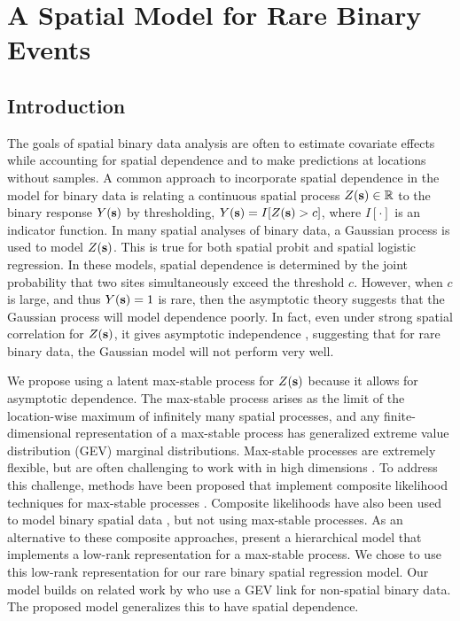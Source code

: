 \chapter{A Spatial Model for Rare Binary Events}
\label{chap:three}

\section{Introduction}\label{rbs:intro}

The goals of spatial binary data analysis are often to estimate covariate effects while accounting for spatial dependence and to make predictions at locations without samples.
A common approach to incorporate spatial dependence in the model for binary data is relating a continuous spatial process $Z(\mathbf{s}) \in \mathbb{R}$ to the binary response $Y(\mathbf{s})$ by thresholding, $Y(\mathbf{s}) = I[Z(\mathbf{s}) > c]$, where $I[\cdot]$ is an indicator function.
In many spatial analyses of binary data, a Gaussian process is used to model $Z(\mathbf{s})$.
This is true for both spatial probit and spatial logistic regression.
In these models, spatial dependence is determined by the joint probability that two sites simultaneously exceed the threshold $c$.
However, when $c$ is large, and thus $Y(\mathbf{s}) = 1$ is rare, then the asymptotic theory suggests that the Gaussian process will model dependence poorly.
In fact, even under strong spatial correlation for $Z(\mathbf{s})$, it gives asymptotic independence \citep{Sibuya1960}, suggesting that for rare binary data, the Gaussian model will not perform very well.

We propose using a latent max-stable process \citep{deHaan1984} for $Z(\mathbf{s})$ because it allows for asymptotic dependence.
The max-stable process arises as the limit of the location-wise maximum of infinitely many spatial processes, and any finite-dimensional representation of a max-stable process has generalized extreme value distribution (GEV) marginal distributions.
Max-stable processes are extremely flexible, but are often challenging to work with in high dimensions \citep{Wadsworth2014,Thibaud2013a}.
To address this challenge, methods have been proposed that implement composite likelihood techniques for max-stable processes \citep{Padoan2010,Genton2011,Huser2014}.
Composite likelihoods have also been used to model binary spatial data \citep{Heagerty1998}, but not using max-stable processes.
As an alternative to these composite approaches, \citet{Reich2012} present a hierarchical model that implements a low-rank representation for a max-stable process.
We chose to use this low-rank representation for our rare binary spatial regression model.
Our model builds on related work by \citet{Wang2010} who use a GEV link for non-spatial binary data.
The proposed model generalizes this to have spatial dependence.

